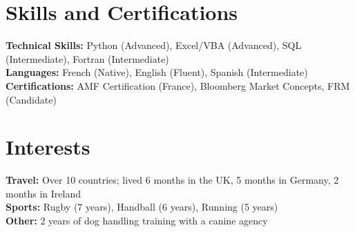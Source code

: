 \documentclass[10pt,a4paper]{article}
\begin{document}
\vspace{0.05cm}

\section*{Skills and Certifications}
\textbf{Technical Skills:} Python (Advanced), Excel/VBA (Advanced), SQL (Intermediate), Fortran (Intermediate) \\
\textbf{Languages:} French (Native), English (Fluent), Spanish (Intermediate) \\
\textbf{Certifications:} AMF Certification (France), Bloomberg Market Concepts, FRM (Candidate)

\vspace{0.05cm}

\section*{Interests}
\textbf{Travel:} Over 10 countries; lived 6 months in the UK, 5 months in Germany, 2 months in Ireland \\
\textbf{Sports:} Rugby (7 years), Handball (6 years), Running (5 years) \\
\textbf{Other:} 2 years of dog handling training with a canine agency
\end{document}
